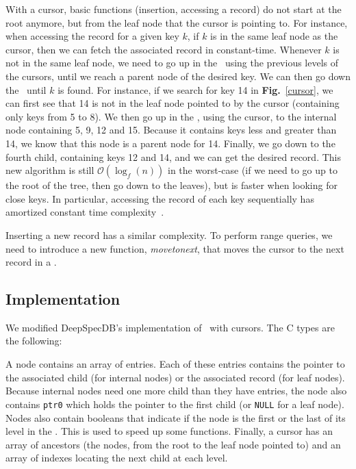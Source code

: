 \cursor

With a cursor, basic functions (insertion, accessing a record) do not start at the root anymore, but from the leaf node that the cursor is pointing to.
For instance, when accessing the record for a given key $k$, if $k$ is in the same leaf node as the cursor, then we can fetch the associated record in constant-time.
Whenever $k$ is not in the same leaf node, we need to go up in the \btree\ using the previous levels of the cursors, until we reach a parent node of the desired key.
We can then go down the \btree\ until $k$ is found.
For instance, if we search for key 14 in \textbf{Fig.}~\ref{cursor}, we can first see that 14 is not in the leaf node pointed to by the cursor (containing only keys from 5 to 8).
We then go up in the \btree, using the cursor, to the internal node containing 5, 9, 12 and 15.
Because it contains keys less and greater than 14, we know that this node is a parent node for 14.
Finally, we go down to the fourth child, containing keys 12 and 14, and we can get the desired record.
This new algorithm is still $\mathcal{O}(\log_{f}(n))$ in the worst-case (if we need to go up to the root of the tree, then go down to the leaves),
but is faster when looking for close keys.
In particular, accessing the record of each key sequentially has amortized constant time complexity~\cite{tosin}.

Inserting a new record has a similar complexity.
To perform range queries, we need to introduce a new function, \textit{movetonext}, that moves the cursor to the next record in a \btree.

\subsection{Implementation}
We modified DeepSpecDB's implementation of \btrees\ with cursors. The C types are the following:

\begin{multicols}{2}

\end{multicols}

A node contains an array of entries.
Each of these entries contains the pointer to the associated child (for internal nodes) or the associated record (for leaf nodes).
Because internal nodes need one more child than they have entries, the node also contains \texttt{ptr0} which holds the pointer to the first child (or \texttt{NULL} for a leaf node).
Nodes also contain booleans that indicate if the node is the first or the last of its level in the \btree.
This is used to speed up some functions.
Finally, a cursor has an array of ancestors (the nodes, from the root to the leaf node pointed to) and an array of indexes locating the next child at each level.

